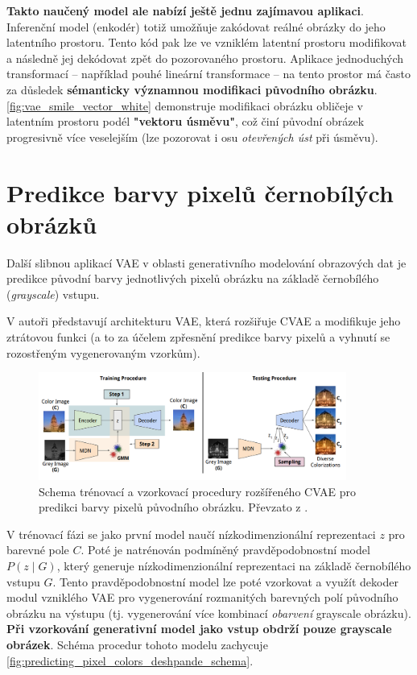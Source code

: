 \textbf{Takto naučený model ale nabízí ještě jednu zajímavou aplikaci}.
Inferenční model (enkodér) totiž umožňuje zakódovat reálné obrázky do jeho latentního prostoru.
Tento kód pak lze ve vzniklém latentní prostoru modifikovat a následně jej dekódovat zpět do pozorovaného prostoru.
Aplikace jednoduchých transformací – například pouhé lineární transformace – na tento prostor má často za důsledek \textbf{sémanticky významnou modifikaci původního obrázku}.
\autoref{fig:vae_smile_vector_white} demonstruje modifikaci obrázku obličeje v latentním prostoru podél \textbf{"vektoru úsměvu"}, což činí původní obrázek progresivně více veselejším (lze pozorovat i osu \emph{otevřených úst} při úsměvu). \cite{Kingma2019}

\newpage
\section{Predikce barvy pixelů černobílých obrázků}
Další slibnou aplikací VAE v oblasti generativního modelování obrazových dat je predikce původní barvy jednotlivých pixelů obrázku na základě černobílého (\emph{grayscale}) vstupu.

V \cite{Deshpande2017} autoři představují architekturu VAE, která rozšiřuje CVAE a modifikuje jeho ztrátovou funkci (a to za účelem zpřesnění predikce barvy pixelů a vyhnutí se rozostřeným vygenerovaným vzorkům).
\begin{figure}[H]
    \centering
    \includegraphics[width=0.9\textwidth]{figures/applications/predicting_pixel_colors_deshpande_vae_schema.png}
    \caption{Schema trénovací a vzorkovací procedury rozšířeného CVAE pro predikci barvy pixelů původního obrázku. Převzato z \cite{Deshpande2017}.}
    \label{fig:predicting_pixel_colors_deshpande_schema}
\end{figure}

V trénovací fázi se jako první model naučí nízkodimenzionální reprezentaci $z$ pro barevné pole $C$.
Poté je natrénován podmíněný pravděpodobnostní model $P(z \mid G)$, který generuje nízkodimenzionální reprezentaci na základě černobílého vstupu $G$. 
Tento pravděpodobnostní model lze poté vzorkovat a využít dekoder modul vzniklého VAE pro vygenerování rozmanitých barevných polí původního obrázku na výstupu (tj. vygenerování více kombinací \emph{obarvení} grayscale obrázku).
\textbf{Při vzorkování generativní model jako vstup obdrží pouze grayscale obrázek}. Schéma procedur tohoto modelu zachycuje \autoref{fig:predicting_pixel_colors_deshpande_schema}. \cite{Deshpande2017}

